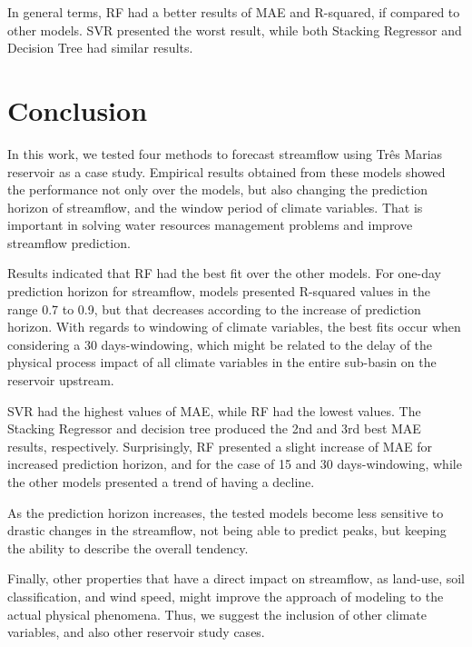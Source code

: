 \documentclass[12pt]{article}
\begin{document}
In general terms, RF had a better results of MAE and R-squared, if compared to other models. SVR presented the worst result, while both Stacking Regressor and Decision Tree had similar results.

\section{Conclusion}
\label{sec:Conclusion}

In this work, we tested four methods to forecast streamflow using Três Marias reservoir as a case study. Empirical results obtained from these models showed the performance not only over the models, but also changing the prediction horizon of streamflow, and the window period of climate variables. That is important in solving water resources management problems and improve streamflow prediction.

Results indicated that RF had the best fit over the other models. For one-day prediction horizon for streamflow, models presented R-squared values in the range 0.7 to 0.9, but that decreases according to the increase of  prediction horizon. With regards to windowing of climate variables, the best fits occur when considering a 30 days-windowing, which might be related to the delay of the physical process impact of all climate variables in the entire sub-basin on the reservoir upstream.

SVR had the highest values of MAE, while RF had the lowest values. The Stacking Regressor and decision tree produced the 2nd and 3rd best MAE results, respectively. Surprisingly, RF presented a slight increase of MAE for increased prediction horizon, and for the case of 15 and 30 days-windowing, while the other models presented a trend of having a decline.

As the prediction horizon increases, the tested models become less sensitive to drastic changes in the streamflow, not being able to predict peaks, but keeping the ability to describe the overall tendency.

Finally, other properties that have a direct impact on streamflow, as land-use, soil classification, and wind speed, might improve the approach of modeling to the actual physical phenomena. Thus, we suggest the inclusion of other climate variables, and also other reservoir study cases.




\appendix

\end{document}
